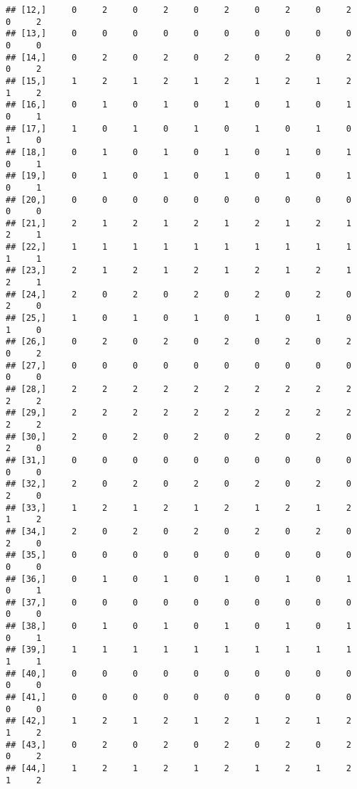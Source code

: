 \documentclass[
]{article}
\begin{document}
\begin{verbatim}
## [12,]     0     2     0     2     0     2     0     2     0     2     0     2
## [13,]     0     0     0     0     0     0     0     0     0     0     0     0
## [14,]     0     2     0     2     0     2     0     2     0     2     0     2
## [15,]     1     2     1     2     1     2     1     2     1     2     1     2
## [16,]     0     1     0     1     0     1     0     1     0     1     0     1
## [17,]     1     0     1     0     1     0     1     0     1     0     1     0
## [18,]     0     1     0     1     0     1     0     1     0     1     0     1
## [19,]     0     1     0     1     0     1     0     1     0     1     0     1
## [20,]     0     0     0     0     0     0     0     0     0     0     0     0
## [21,]     2     1     2     1     2     1     2     1     2     1     2     1
## [22,]     1     1     1     1     1     1     1     1     1     1     1     1
## [23,]     2     1     2     1     2     1     2     1     2     1     2     1
## [24,]     2     0     2     0     2     0     2     0     2     0     2     0
## [25,]     1     0     1     0     1     0     1     0     1     0     1     0
## [26,]     0     2     0     2     0     2     0     2     0     2     0     2
## [27,]     0     0     0     0     0     0     0     0     0     0     0     0
## [28,]     2     2     2     2     2     2     2     2     2     2     2     2
## [29,]     2     2     2     2     2     2     2     2     2     2     2     2
## [30,]     2     0     2     0     2     0     2     0     2     0     2     0
## [31,]     0     0     0     0     0     0     0     0     0     0     0     0
## [32,]     2     0     2     0     2     0     2     0     2     0     2     0
## [33,]     1     2     1     2     1     2     1     2     1     2     1     2
## [34,]     2     0     2     0     2     0     2     0     2     0     2     0
## [35,]     0     0     0     0     0     0     0     0     0     0     0     0
## [36,]     0     1     0     1     0     1     0     1     0     1     0     1
## [37,]     0     0     0     0     0     0     0     0     0     0     0     0
## [38,]     0     1     0     1     0     1     0     1     0     1     0     1
## [39,]     1     1     1     1     1     1     1     1     1     1     1     1
## [40,]     0     0     0     0     0     0     0     0     0     0     0     0
## [41,]     0     0     0     0     0     0     0     0     0     0     0     0
## [42,]     1     2     1     2     1     2     1     2     1     2     1     2
## [43,]     0     2     0     2     0     2     0     2     0     2     0     2
## [44,]     1     2     1     2     1     2     1     2     1     2     1     2

\end{verbatim}
\end{document}
